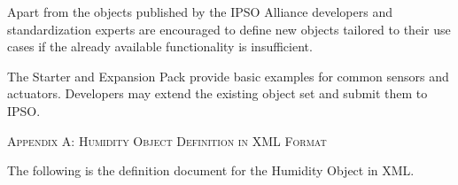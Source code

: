 \documentclass[peerreview, a4paper, 7pt]{IEEEtran}
\begin{document}
Apart from the objects published by the IPSO Alliance developers and standardization experts are encouraged to define new objects tailored to their use cases if the already available functionality is insufficient. %

The Starter and Expansion Pack provide basic examples for common sensors and actuators. Developers may extend the existing object set and submit them to IPSO. %


% 



\appendix
\label{appendix_a}

\textsc{Appendix A: Humidity Object Definition in XML Format}

The following is the definition document for the Humidity Object in XML.
\end{document}
